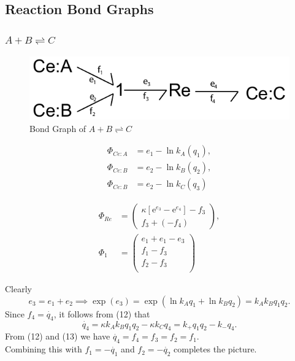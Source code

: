 \documentclass[10pt,reqno]{beamer}
\newcommand{\e}{\mathrm{e}}
\begin{document}
\subsection{Reaction Bond Graphs}
\begin{frame}

\frametitle{$A+B\rightleftharpoons C$}
{\scriptsize
	\begin{figure}
		\includegraphics[scale=0.5]{images/bondgraph_abc_naive}
		\caption{Bond Graph of $A+B \rightleftharpoons C$}
	\end{figure}
	\begin{minipage}{0.475\textwidth}
		\begin{align}
		\Phi_{Ce:A} &= e_1 - \ln k_A(q_1),\\
		\Phi_{Ce:B} &= e_2 - \ln k_B(q_2),\\
		\Phi_{Ce:B} &= e_2 - \ln k_C(q_3)
		\end{align}
	\end{minipage}
	\begin{minipage}{0.475\textwidth}
		\begin{align}\Phi_{Re} &= \left(
		\begin{matrix}
		\kappa\left[\e^{e_3} - \e^{e_4}\right] - f_3\\
		f_3 + (- f_4)
		\end{matrix}
		\right),\\
		\Phi_{1} &= \left(\begin{matrix}
		e_1 +e_1 - e_3 \\
		f_1 - f_3\\
		f_2 - f_3\\
		\end{matrix}\right)
		\end{align}
	\end{minipage}
	
	\vfill
	Clearly
	\[
	e_3 = e_1 + e_2 \implies \exp(e_3) = \exp(\ln k_A q_1 + \ln k_Bq_2) = k_Ak_B q_1q_2.
	\]
	Since $f_4 = \dot{q_4}$,  it follows from (12) that
	\[
	\dot{q_4} =  \kappa k_Ak_B q_1q_2 - \kappa k_C q_4 = k_+q_1q_2 - k_-q_4.
	\]
	From (12) and (13) we have $\dot{q_4} = f_4 =f_3= f_2 = f_1$.\\
	Combining this with $f_1 = -\dot{q_1} $ and $f_2 = -\dot{q_2}$ completes the picture.
}
\end{frame}
\end{document}
